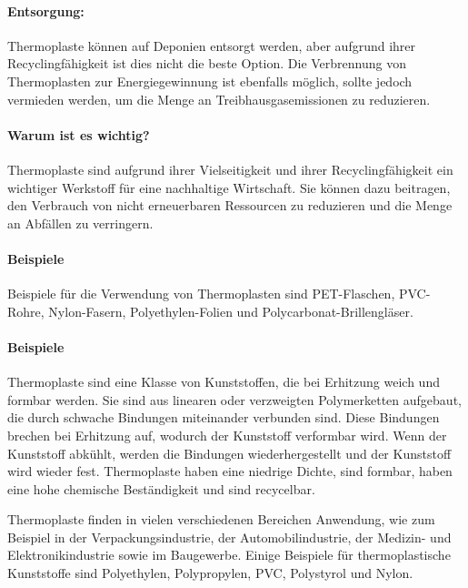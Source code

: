 \documentclass{article}
\begin{document}
\begin{multicols}{3}
\paragraph{Entsorgung:}
Thermoplaste können auf Deponien entsorgt werden, aber aufgrund ihrer
Recyclingfähigkeit ist dies nicht die beste Option. Die Verbrennung von
Thermoplasten zur Energiegewinnung ist ebenfalls möglich, sollte jedoch
vermieden werden, um die Menge an Treibhausgasemissionen zu reduzieren.

\paragraph{Warum ist es wichtig?}
Thermoplaste sind aufgrund ihrer Vielseitigkeit und ihrer Recyclingfähigkeit
ein wichtiger Werkstoff für eine nachhaltige Wirtschaft. Sie können dazu
beitragen, den Verbrauch von nicht erneuerbaren Ressourcen zu reduzieren und
die Menge an Abfällen zu verringern.

\paragraph{Beispiele}
Beispiele für die Verwendung von Thermoplasten sind PET-Flaschen, PVC-Rohre,
Nylon-Fasern, Polyethylen-Folien und Polycarbonat-Brillengläser.

\paragraph{Beispiele}
Thermoplaste sind eine Klasse von Kunststoffen, die bei Erhitzung weich und
formbar werden. Sie sind aus linearen oder verzweigten Polymerketten aufgebaut,
die durch schwache Bindungen miteinander verbunden sind. Diese Bindungen
brechen bei Erhitzung auf, wodurch der Kunststoff verformbar wird. Wenn der
Kunststoff abkühlt, werden die Bindungen wiederhergestellt und der Kunststoff
wird wieder fest. Thermoplaste haben eine niedrige Dichte, sind formbar, haben
eine hohe chemische Beständigkeit und sind recycelbar.

Thermoplaste finden in vielen verschiedenen Bereichen Anwendung, wie zum
Beispiel in der Verpackungsindustrie, der Automobilindustrie, der Medizin- und
Elektronikindustrie sowie im Baugewerbe. Einige Beispiele für thermoplastische
Kunststoffe sind Polyethylen, Polypropylen, PVC, Polystyrol und Nylon.
\end{multicols}

\clearpage
\end{document}
